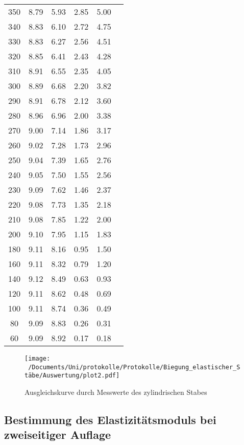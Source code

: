 \begin{table}
\begin{tabular}{c c c c c c}
    350 & 8.79 & 5.93 & 2.85 & 5.00 \\
    340 & 8.83 & 6.10 & 2.72 & 4.75 \\
    330 & 8.83 & 6.27 & 2.56 & 4.51 \\
    320 & 8.85 & 6.41 & 2.43 & 4.28 \\
    310 & 8.91 & 6.55 & 2.35 & 4.05 \\
    300 & 8.89 & 6.68 & 2.20 & 3.82 \\
    290 & 8.91 & 6.78 & 2.12 & 3.60 \\
    280 & 8.96 & 6.96 & 2.00 & 3.38 \\
    270 & 9.00 & 7.14 & 1.86 & 3.17 \\
    260 & 9.02 & 7.28 & 1.73 & 2.96 \\
    250 & 9.04 & 7.39 & 1.65 & 2.76 \\
    240 & 9.05 & 7.50 & 1.55 & 2.56 \\
    230 & 9.09 & 7.62 & 1.46 & 2.37 \\
    220 & 9.08 & 7.73 & 1.35 & 2.18 \\
    210 & 9.08 & 7.85 & 1.22 & 2.00 \\
    200 & 9.10 & 7.95 & 1.15 & 1.83 \\
    180 & 9.11 & 8.16 & 0.95 & 1.50 \\
    160 & 9.11 & 8.32 & 0.79 & 1.20 \\
    140 & 9.12 & 8.49 & 0.63 & 0.93 \\
    120 & 9.11 & 8.62 & 0.48 & 0.69 \\
    100 & 9.11 & 8.74 & 0.36 & 0.49 \\
    80 & 9.09 & 8.83 & 0.26 & 0.31 \\
    60 & 9.09 & 8.92 & 0.17 & 0.18 \\
    \bottomrule
  \end{tabular}
\end{table}

\begin{figure}
  \centering
  \texttt{[image: ~/Documents/Uni/protokolle/Protokolle/Biegung\_elastischer\_Stäbe/Auswertung/plot2.pdf]}
  \caption{Ausgleichskurve durch Messwerte des zylindrischen Stabes}
  \label{fig:kurveZyl}
\end{figure}

\subsection{Bestimmung des Elastizitätsmoduls bei zweiseitiger Auflage}

